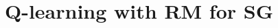 \documentclass[10pt, aspectratio=169]{beamer}
\begin{document}
%    

\section{Q-learning with RM for SG}

\end{document}
